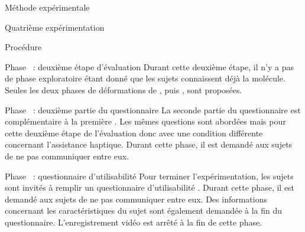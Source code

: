 \documentclass[myfrancais,ngerman,english,frenchb]{mythesis}
\begin{document}
\begin{mychapter}{Méthode expérimentale}
\begin{mysection}{Quatrième expérimentation}
\begin{mysubsection}{Procédure}
\begin{myparagraph}{Phase~ : deuxième étape d'évaluation}
					Durant cette deuxième étape, il n'y a pas de phase exploratoire étant donné que les sujets connaissent déjà la molécule.
					Seules les deux phases de déformations de , \myUbiquitin puis \myNusENusG, sont proposées.
				\end{myparagraph}
				\begin{myparagraph}{Phase~ : deuxième partie du questionnaire}
					La seconde partie du questionnaire est complémentaire à la première .
					Les mêmes questions sont abordées mais pour cette deuxième étape de l'évaluation donc avec une condition différente concernant l'assistance haptique.
					Durant cette phase, il est demandé aux sujets de ne pas communiquer entre eux.
				\end{myparagraph}
				\begin{myparagraph}{Phase~ : questionnaire d'utilisabilité}
					Pour terminer l'expérimentation, les sujets sont invités à remplir un questionnaire d'utilisabilité .
					Durant cette phase, il est demandé aux sujets de ne pas communiquer entre eux.
					Des informations concernant les caractéristiques du sujet sont également demandée à la fin du questionnaire.
					L'enregistrement vidéo est arrêté à la fin de cette phase.
				\end{myparagraph}
			\end{mysubsection}
		\end{mysection}
	\end{mychapter}
\end{document}
